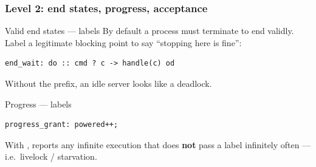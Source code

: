 \begin{frame}[fragile]
  \frametitle{Level 2: end states, progress, acceptance} \small

\begin{block}{Valid end states ---  labels}\small
By default a process must terminate to end validly. Label a legitimate blocking
point to say ``stopping here is fine'':
\begin{lstlisting}[language=promela]
end_wait: do :: cmd ? c -> handle(c) od
\end{lstlisting}
Without the  prefix, an idle server looks like a deadlock.
\end{block}

\pause

\begin{block}{Progress ---  labels}\small
\begin{lstlisting}[language=promela]
progress_grant: powered++;
\end{lstlisting}
With , \spin{} reports any infinite execution that does {\bf not}
pass a  label infinitely often --- i.e.\ livelock / starvation.
\end{block}

\end{frame}

